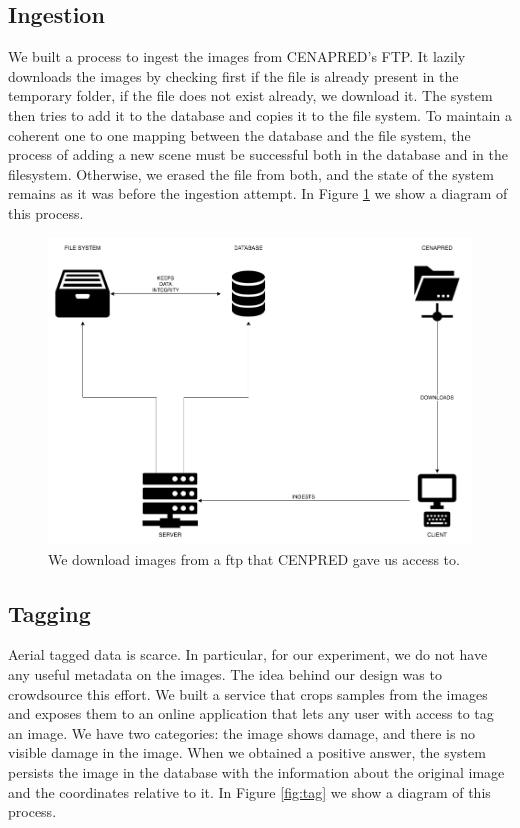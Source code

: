 \subsection{Ingestion}

We built a process to ingest the images from CENAPRED's FTP. It lazily downloads the images by checking first if the file is already present in the temporary folder, if the file does not exist already, we download it. The system then tries to add it to the database and copies it to the file system. To maintain a coherent one to one mapping between the database and the file system, the process of adding a new scene must be successful both in the database and in the filesystem. Otherwise, we erased the file from both, and the state of the system remains as it was before the ingestion attempt. In Figure \ref{fig:ingest} we show a diagram of this process.\\

\begin{figure}[!h]
  \centering
  \includegraphics[width=1\textwidth]{images/ingest-diagram.png}
  \caption{We download images from a ftp that CENPRED gave us access to.}
  \label{fig:ingest}
\end{figure}

\subsection{Tagging}

Aerial tagged data is scarce. In particular, for our experiment, we do not have any useful metadata on the images. The idea behind our design was to crowdsource this effort. We built a service that crops samples from the images and exposes them to an online application that lets any user with access to tag an image. We have two categories: the image shows damage, and there is no visible damage in the image. When we obtained a positive answer, the system persists the image in the database with the information about the original image and the coordinates relative to it. In Figure \ref{fig:tag} we show a diagram of this process.\\


